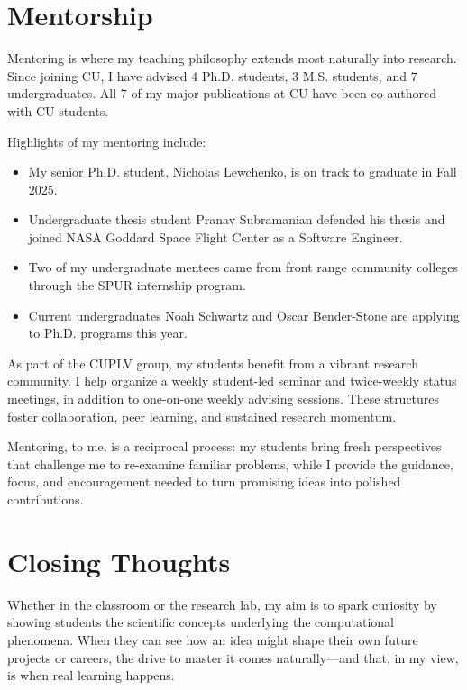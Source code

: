 \section*{Mentorship}
Mentoring is where my teaching philosophy extends most naturally into research. Since joining CU, I have advised 4 Ph.D. students, 3 M.S. students, and 7 undergraduates. All 7 of my major publications at CU have been co-authored with CU students. 

Highlights of my mentoring include:
\begin{itemize}
    \item My senior Ph.D. student, Nicholas Lewchenko, is on track to graduate in Fall 2025.
    \item Undergraduate thesis student Pranav Subramanian defended his thesis and joined NASA Goddard Space Flight Center as a Software Engineer.
    \item Two of my undergraduate mentees came from front range community colleges through the SPUR internship program.
    \item Current undergraduates Noah Schwartz and Oscar Bender-Stone are applying to Ph.D. programs this year.
\end{itemize}

As part of the CUPLV group, my students benefit from a vibrant research community. I help organize a weekly student-led seminar and twice-weekly status meetings, in addition to one-on-one weekly advising sessions. These structures foster collaboration, peer learning, and sustained research momentum. 

Mentoring, to me, is a reciprocal process: my students bring fresh perspectives that challenge me to re-examine familiar problems, while I provide the guidance, focus, and encouragement needed to turn promising ideas into polished contributions.

\section*{Closing Thoughts}
Whether in the classroom or the research lab, my aim is to spark curiosity
by showing students the scientific concepts underlying the computational
phenomena. When they can see how an idea might shape their own future
projects or careers, the drive to master it comes naturally—and that, in my
view, is when real learning happens.
